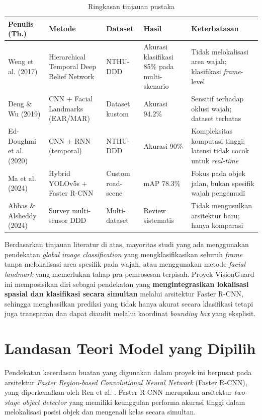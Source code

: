 \documentclass[11pt,a4paper,oneside]{report}
\begin{document}
\begin{table}[h!]
\centering
\caption{Ringkasan tinjauan pustaka}
\label{tab:related-work}
\footnotesize
\begin{tabularx}{\textwidth}{p{2.2cm}XXXX}
\toprule
\textbf{Penulis (Th.)} & \textbf{Metode} & \textbf{Dataset} & \textbf{Hasil} & \textbf{Keterbatasan} \\
\midrule
Weng et al. (2017) \cite{weng2017driver} & Hierarchical Temporal Deep Belief Network & NTHU-DDD & Akurasi klasifikasi 85\% pada multi-skenario & Tidak melokalisasi area wajah; klasifikasi \textit{frame}-level \\
Deng \& Wu (2019) \cite{deng2019deep} & CNN + Facial Landmarks (EAR/MAR) & Dataset kustom & Akurasi 94.2\% & Sensitif terhadap oklusi wajah; dataset terbatas \\
Ed-Doughmi et al. (2020) \cite{ed2020deep} & CNN + RNN (temporal) & NTHU-DDD & Akurasi 90\% & Kompleksitas komputasi tinggi; latensi tidak cocok untuk \textit{real-time} \\
Ma et al. (2024) \cite{ma2024hybrid} & Hybrid YOLOv5s + Faster R-CNN & Custom road-scene & mAP 78.3\% & Fokus pada objek jalan, bukan spesifik wajah pengemudi \\
Abbas \& Alsheddy (2024) \cite{abbas2024ddd} & Survey multi-sensor DDD & Multi-dataset & Review sistematis & Tidak mengusulkan arsitektur baru; hanya komparasi \\
\bottomrule
\end{tabularx}
\end{table}

Berdasarkan tinjauan literatur di atas, mayoritas studi yang ada menggunakan pendekatan \textit{global image classification} yang mengklasifikasikan seluruh \textit{frame} tanpa melokalisasi area spesifik pada wajah, atau menggunakan metode \textit{facial landmark} yang memerlukan tahap pra-pemrosesan terpisah. Proyek VisionGuard ini memposisikan diri sebagai pendekatan yang \textbf{mengintegrasikan lokalisasi spasial dan klasifikasi secara simultan} melalui arsitektur Faster R-CNN, sehingga menghasilkan prediksi yang tidak hanya akurat secara klasifikasi tetapi juga transparan dan dapat diaudit melalui koordinat \textit{bounding box} yang eksplisit.

\section{Landasan Teori Model yang Dipilih}

Pendekatan kecerdasan buatan yang digunakan dalam proyek ini berpusat pada arsitektur \textit{Faster Region-based Convolutional Neural Network} (Faster R-CNN), yang diperkenalkan oleh Ren et al. \cite{ren2015faster}. Faster R-CNN merupakan arsitektur \textit{two-stage object detector} yang memiliki keunggulan performa akurasi tinggi dalam melokalisasi posisi objek dan mengenali kelas secara simultan.
\end{document}
